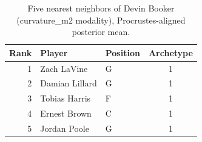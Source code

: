 \begin{table}[htbp]
  \centering\small
  \begin{tabular}{rllc}
    \toprule
    Rank & Player & Position & Archetype \\
    \midrule
    1 & Zach LaVine & G & 1 \\
    2 & Damian Lillard & G & 1 \\
    3 & Tobias Harris & F & 1 \\
    4 & Ernest Brown & C & 1 \\
    5 & Jordan Poole & G & 1 \\
    \bottomrule
  \end{tabular}
  \caption{Five nearest neighbors of Devin Booker (curvature_m2 modality), Procrustes-aligned posterior mean.}
  \label{tab:Devin_Booker_neighbors_curvature_m2}
\end{table}


